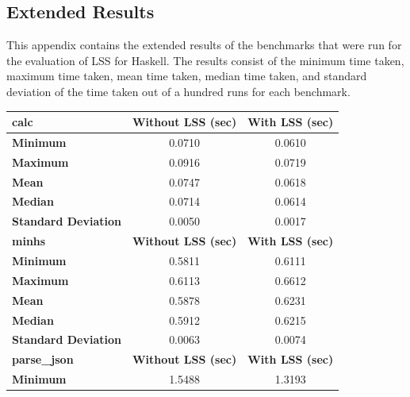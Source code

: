 \documentclass[a4paper,UKenglish,cleveref, autoref, thm-restate]{template/lipics-v2021}
\newcommand{\lss}{LSS\xspace}
\begin{document}
\begin{appendices}

  \section{Extended Results}\label{sec:ext-res}
  This appendix contains the extended results of the benchmarks that were run for the evaluation of \lss for Haskell. The results consist of the minimum time taken, maximum time taken, mean time taken, median time taken, and standard deviation of the time taken out of a hundred runs for each benchmark.
  \begin{table}
    \begin{tabular}{l|c c}
      \textbf{calc}               & \textbf{Without LSS (sec)} & \textbf{With LSS (sec)} \\
      \hline
      \textbf{Minimum}            & 0.0710                     & 0.0610                  \\
      \textbf{Maximum}            & 0.0916                     & 0.0719                  \\
      \textbf{Mean}               & 0.0747                     & 0.0618                  \\
      \textbf{Median}             & 0.0714                     & 0.0614                  \\
      \textbf{Standard Deviation} & 0.0050                     & 0.0017                  \\
      \hline
      \textbf{minhs}              & \textbf{Without LSS (sec)} & \textbf{With LSS (sec)} \\
      \hline
      \textbf{Minimum}            & 0.5811                     & 0.6111                  \\
      \textbf{Maximum}            & 0.6113                     & 0.6612                  \\
      \textbf{Mean}               & 0.5878                     & 0.6231                  \\
      \textbf{Median}             & 0.5912                     & 0.6215                  \\
      \textbf{Standard Deviation} & 0.0063                     & 0.0074                  \\
      \hline
      \textbf{parse\_json}        & \textbf{Without LSS (sec)} & \textbf{With LSS (sec)} \\
      \hline
      \textbf{Minimum}            & 1.5488                     & 1.3193                  \\

\end{tabular}
\end{table}
\end{appendices}
\end{document}
